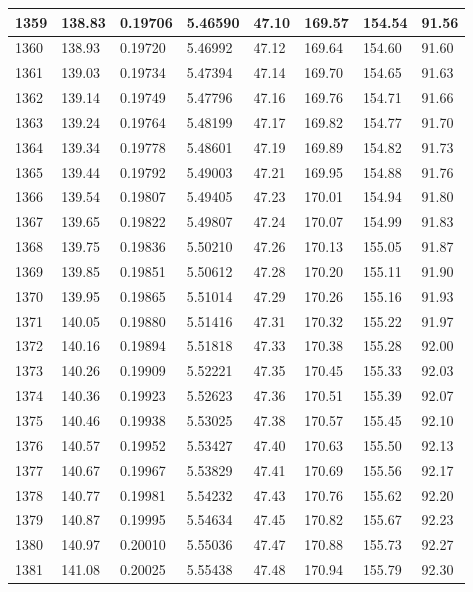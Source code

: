\documentclass[12pt,a4paper,twoside]{article}
\begin{document}
\begin{center}
\begin{longtable}{l l l l | l l l l}
1359 & 138.83 & 0.19706 & 5.46590 & 47.10 & 169.57 & 154.54 & 91.56 \\ \hline
1360 & 138.93 & 0.19720 & 5.46992 & 47.12 & 169.64 & 154.60 & 91.60 \\ \hline
1361 & 139.03 & 0.19734 & 5.47394 & 47.14 & 169.70 & 154.65 & 91.63 \\ \hline
1362 & 139.14 & 0.19749 & 5.47796 & 47.16 & 169.76 & 154.71 & 91.66 \\ \hline
1363 & 139.24 & 0.19764 & 5.48199 & 47.17 & 169.82 & 154.77 & 91.70 \\ \hline
1364 & 139.34 & 0.19778 & 5.48601 & 47.19 & 169.89 & 154.82 & 91.73 \\ \hline
1365 & 139.44 & 0.19792 & 5.49003 & 47.21 & 169.95 & 154.88 & 91.76 \\ \hline
1366 & 139.54 & 0.19807 & 5.49405 & 47.23 & 170.01 & 154.94 & 91.80 \\ \hline
1367 & 139.65 & 0.19822 & 5.49807 & 47.24 & 170.07 & 154.99 & 91.83 \\ \hline
1368 & 139.75 & 0.19836 & 5.50210 & 47.26 & 170.13 & 155.05 & 91.87 \\ \hline
1369 & 139.85 & 0.19851 & 5.50612 & 47.28 & 170.20 & 155.11 & 91.90 \\ \hline
1370 & 139.95 & 0.19865 & 5.51014 & 47.29 & 170.26 & 155.16 & 91.93 \\ \hline
1371 & 140.05 & 0.19880 & 5.51416 & 47.31 & 170.32 & 155.22 & 91.97 \\ \hline
1372 & 140.16 & 0.19894 & 5.51818 & 47.33 & 170.38 & 155.28 & 92.00 \\ \hline
1373 & 140.26 & 0.19909 & 5.52221 & 47.35 & 170.45 & 155.33 & 92.03 \\ \hline
1374 & 140.36 & 0.19923 & 5.52623 & 47.36 & 170.51 & 155.39 & 92.07 \\ \hline
1375 & 140.46 & 0.19938 & 5.53025 & 47.38 & 170.57 & 155.45 & 92.10 \\ \hline
1376 & 140.57 & 0.19952 & 5.53427 & 47.40 & 170.63 & 155.50 & 92.13 \\ \hline
1377 & 140.67 & 0.19967 & 5.53829 & 47.41 & 170.69 & 155.56 & 92.17 \\ \hline
1378 & 140.77 & 0.19981 & 5.54232 & 47.43 & 170.76 & 155.62 & 92.20 \\ \hline
1379 & 140.87 & 0.19995 & 5.54634 & 47.45 & 170.82 & 155.67 & 92.23 \\ \hline
1380 & 140.97 & 0.20010 & 5.55036 & 47.47 & 170.88 & 155.73 & 92.27 \\ \hline
1381 & 141.08 & 0.20025 & 5.55438 & 47.48 & 170.94 & 155.79 & 92.30 \\ \hline

\end{longtable}
\end{center}
\end{document}
